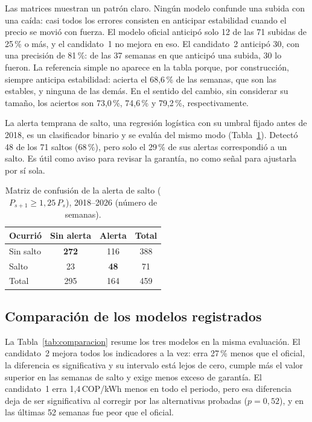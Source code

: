 \documentclass[11pt,letterpaper]{article}
\newcommand{\cop}{\,COP/kWh}
\begin{document}
Las matrices muestran un patrón claro. Ningún modelo confunde una subida
con una caída: casi todos los errores consisten en anticipar estabilidad
cuando el precio se movió con fuerza. El modelo oficial anticipó solo 12
de las 71 subidas de 25\,\% o más, y el candidato~1 no mejora en eso. El
candidato~2 anticipó 30, con una precisión de 81\,\%: de las 37 semanas en
que anticipó una subida, 30 lo fueron. La referencia simple no aparece en
la tabla porque, por construcción, siempre anticipa estabilidad: acierta
el 68,6\,\% de las semanas, que son las estables, y ninguna de las demás.
En el sentido del cambio, sin considerar su tamaño, los aciertos son
73,0\,\%, 74,6\,\% y 79,2\,\%, respectivamente.

La alerta temprana de salto, una regresión logística con su umbral fijado
antes de 2018, es un clasificador binario y se evalúa del mismo modo
(Tabla~\ref{tab:alerta}). Detectó 48 de los 71 saltos (68\,\%), pero solo
el 29\,\% de sus alertas correspondió a un salto. Es útil como aviso para
revisar la garantía, no como señal para ajustarla por sí sola.

\begin{table}[H]
\centering
\caption{Matriz de confusión de la alerta de salto ($P_{s+1}\geq1{,}25\,P_s$),
2018--2026 (número de semanas).}
\label{tab:alerta}
\small
\begin{tabular}{@{}lccc@{}}
\toprule
\textbf{Ocurrió} & \textbf{Sin alerta} & \textbf{Alerta} & \textbf{Total} \\
\midrule
Sin salto & \textbf{272} & 116 & 388 \\
Salto     & 23 & \textbf{48} & 71 \\
\midrule
Total     & 295 & 164 & 459 \\
\bottomrule
\end{tabular}
\end{table}

\subsection{Comparación de los modelos registrados}

La Tabla~\ref{tab:comparacion} resume los tres modelos en la misma
evaluación. El candidato~2 mejora todos los indicadores a la vez: erra
27\,\% menos que el oficial, la diferencia es significativa y su
intervalo está lejos de cero, cumple más el valor superior en las
semanas de salto y exige menos exceso de garantía. El candidato~1 erra
1,4\cop{} menos en todo el periodo, pero esa diferencia deja de ser
significativa al corregir por las alternativas probadas ($p=0{,}52$), y en
las últimas 52 semanas fue peor que el oficial.
\end{document}
